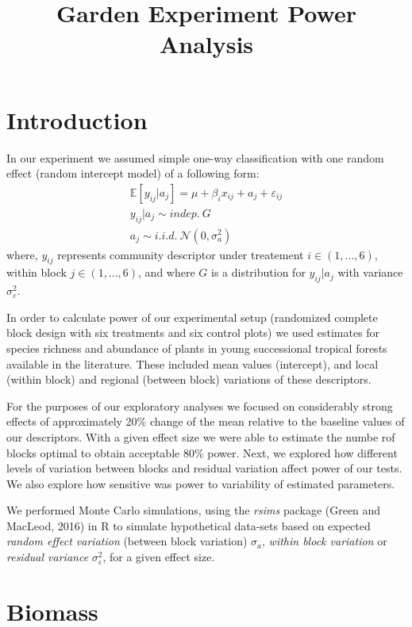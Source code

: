 \documentclass[]{article}
\title{Garden Experiment Power Analysis}
\author{}
\date{}
\begin{document}
\maketitle

\section{Introduction}\label{introduction}

In our experiment we assumed simple one-way classification with one
random effect (random intercept model) of a following form:
\[\begin{matrix} \mathbb{E} [y_{ij}|a_j] = \mu + \beta_ix_{ij} + a_j + \varepsilon_{ij} \\ y_{ij}|a_j \sim indep.\ G\\ a_j \sim i.i.d.\ \mathcal{N}(0,\sigma_a^2) \end{matrix}\]
where, \(y_{ij}\) represents community descriptor under treatement
\(i \in (1,..., 6)\), within block \(j \in (1,..., 6)\), and where \(G\)
is a distribution for \(y_{ij}|a_j\) with variance
\(\sigma^2_{\varepsilon}\).

In order to calculate power of our experimental setup (randomized
complete block design with six treatments and six control plots) we used
estimates for species richness and abundance of plants in young
successional tropical forests available in the literature. These
included mean values (intercept), and local (within block) and regional
(between block) variations of these descriptors.

For the purposes of our exploratory analyses we focused on considerably
strong effects of approximately 20\% change of the mean relative to the
baseline values of our descriptors. With a given effect size we were
able to estimate the numbe rof blocks optimal to obtain acceptable 80\%
power. Next, we explored how different levels of variation between
blocks and residual variation affect power of our tests. We also explore
how sensitive was power to variability of estimated parameters.

We performed Monte Carlo simulations, using the \emph{rsims} package
(Green and MacLeod, 2016) in R to simulate hypothetical data-sets based
on expected \emph{random effect variation} (between block variation)
\(\sigma_{a}\), \emph{within block variation} or \emph{residual
variance} \(\sigma^2_{\varepsilon}\), for a given effect size.

\section{Biomass}\label{biomass}
\end{document}
